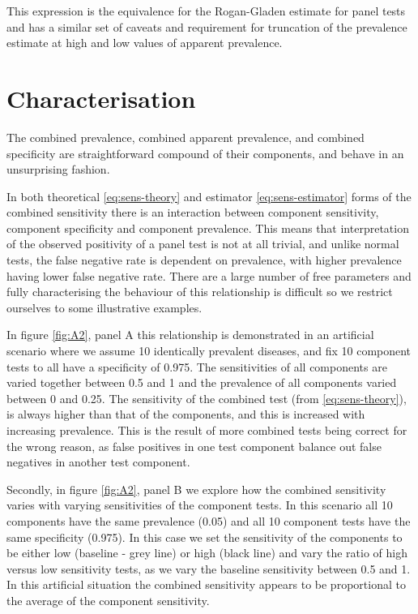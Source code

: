 \documentclass[a4paper, 12pt, twoside]{article}
\let\Oldsection\section
\renewcommand{\section}{\FloatBarrier\Oldsection}
\begin{document}
This expression is the equivalence for the Rogan-Gladen estimate for panel tests and has a similar set of caveats and requirement for truncation of the prevalence estimate at high and low values of apparent prevalence.

\section{Characterisation}

The combined prevalence, combined apparent prevalence, and combined specificity are straightforward compound of their components, and behave in an unsurprising fashion.

In both theoretical \eqref{eq:sens-theory} and estimator \eqref{eq:sens-estimator} forms of the combined sensitivity there is an interaction between component sensitivity, component specificity and component prevalence. This means that interpretation of the observed positivity of a panel test is not at all trivial, and unlike normal tests, the false negative rate is dependent on prevalence, with higher prevalence having lower false negative rate. There are a large number of free parameters and fully characterising the behaviour of this relationship is difficult so we restrict ourselves to some illustrative examples.

In figure \ref{fig:A2}, panel A this relationship is demonstrated in an artificial scenario where we assume 10 identically prevalent diseases, and fix 10 component tests to all have a specificity of 0.975. The sensitivities of all components are varied together between 0.5 and 1 and the prevalence of all components varied between 0 and 0.25. The sensitivity of the combined test (from \eqref{eq:sens-theory}), is always higher than that of the components, and this is increased with increasing prevalence. This is the result of more combined tests being correct for the wrong reason, as false positives in one test component balance out false negatives in another test component.

Secondly, in figure \ref{fig:A2}, panel B we explore how the combined sensitivity varies with varying sensitivities of the component tests. In this scenario all 10 components have the same prevalence (0.05) and all 10 component tests have the same specificity (0.975). In this case we set the sensitivity of the components to be either low (baseline - grey line) or high (black line) and vary the ratio of high versus low sensitivity tests, as we vary the baseline sensitivity between 0.5 and 1. In this artificial situation the combined sensitivity appears to be proportional to the average of the component sensitivity.
\end{document}
